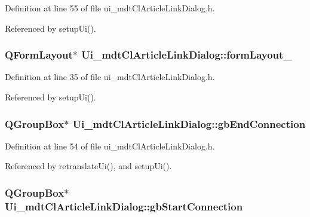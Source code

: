 Definition at line 55 of file ui\-\_\-mdt\-Cl\-Article\-Link\-Dialog.\-h.



Referenced by setup\-Ui().

\hypertarget{class_ui__mdt_cl_article_link_dialog_a757474e7f792746725f9d8f5c52d9833}{
\subsubsection[{form\-Layout\-\_\-3}]{\setlength{\rightskip}{0pt plus 5cm}Q\-Form\-Layout$\ast$ Ui\-\_\-mdt\-Cl\-Article\-Link\-Dialog\-::form\-Layout\-\_}}\label{class_ui__mdt_cl_article_link_dialog_a757474e7f792746725f9d8f5c52d9833}


Definition at line 35 of file ui\-\_\-mdt\-Cl\-Article\-Link\-Dialog.\-h.



Referenced by setup\-Ui().

\hypertarget{class_ui__mdt_cl_article_link_dialog_a9190400abb240b93af9ceea759b9f8e8}{
\subsubsection[{gb\-End\-Connection}]{\setlength{\rightskip}{0pt plus 5cm}Q\-Group\-Box$\ast$ Ui\-\_\-mdt\-Cl\-Article\-Link\-Dialog\-::gb\-End\-Connection}}\label{class_ui__mdt_cl_article_link_dialog_a9190400abb240b93af9ceea759b9f8e8}


Definition at line 54 of file ui\-\_\-mdt\-Cl\-Article\-Link\-Dialog.\-h.



Referenced by retranslate\-Ui(), and setup\-Ui().

\hypertarget{class_ui__mdt_cl_article_link_dialog_a9031d2d53e2137b8cf6512039043fe49}{
\subsubsection[{gb\-Start\-Connection}]{\setlength{\rightskip}{0pt plus 5cm}Q\-Group\-Box$\ast$ Ui\-\_\-mdt\-Cl\-Article\-Link\-Dialog\-::gb\-Start\-Connection}}\label{class_ui__mdt_cl_article_link_dialog_a9031d2d53e2137b8cf6512039043fe49}


